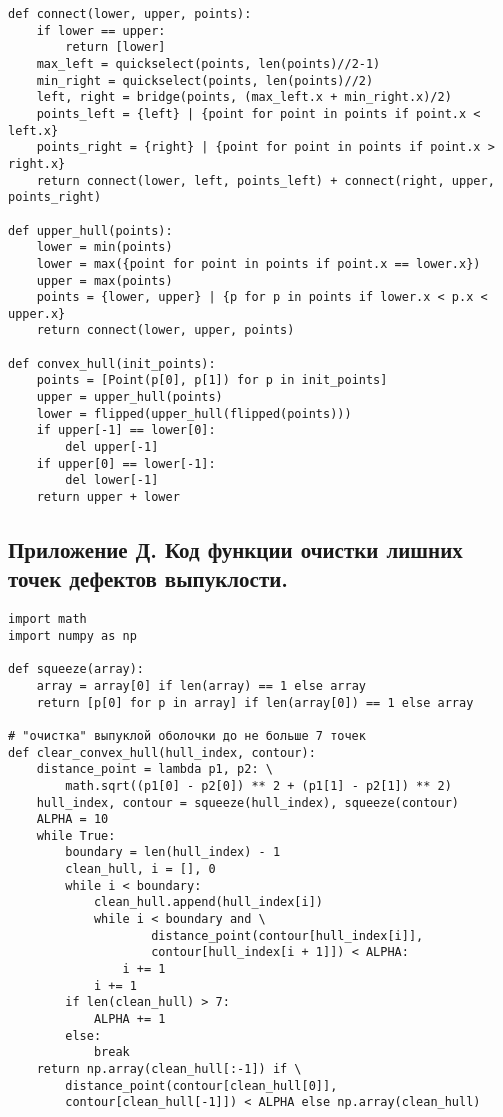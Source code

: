 \begin{verbatim}
def connect(lower, upper, points):
    if lower == upper:
        return [lower]
    max_left = quickselect(points, len(points)//2-1)
    min_right = quickselect(points, len(points)//2)
    left, right = bridge(points, (max_left.x + min_right.x)/2)
    points_left = {left} | {point for point in points if point.x < left.x}
    points_right = {right} | {point for point in points if point.x > right.x}
    return connect(lower, left, points_left) + connect(right, upper, points_right)

def upper_hull(points):
    lower = min(points)
    lower = max({point for point in points if point.x == lower.x})
    upper = max(points)
    points = {lower, upper} | {p for p in points if lower.x < p.x < upper.x}
    return connect(lower, upper, points)

def convex_hull(init_points):
    points = [Point(p[0], p[1]) for p in init_points]
    upper = upper_hull(points)
    lower = flipped(upper_hull(flipped(points)))
    if upper[-1] == lower[0]:
        del upper[-1]
    if upper[0] == lower[-1]:
        del lower[-1]
    return upper + lower
\end{verbatim}

\newpage

\subsection*{Приложение Д. Код функции очистки лишних точек дефектов выпуклости.}

\begin{verbatim}
import math
import numpy as np

def squeeze(array):
    array = array[0] if len(array) == 1 else array
    return [p[0] for p in array] if len(array[0]) == 1 else array

# "очистка" выпуклой оболочки до не больше 7 точек
def clear_convex_hull(hull_index, contour):
    distance_point = lambda p1, p2: \
    	math.sqrt((p1[0] - p2[0]) ** 2 + (p1[1] - p2[1]) ** 2)
    hull_index, contour = squeeze(hull_index), squeeze(contour)
    ALPHA = 10
    while True:
        boundary = len(hull_index) - 1
        clean_hull, i = [], 0
        while i < boundary:
            clean_hull.append(hull_index[i])
            while i < boundary and \
                    distance_point(contour[hull_index[i]],
                    contour[hull_index[i + 1]]) < ALPHA:
                i += 1
            i += 1
        if len(clean_hull) > 7:
            ALPHA += 1
        else:
            break
    return np.array(clean_hull[:-1]) if \
        distance_point(contour[clean_hull[0]],
        contour[clean_hull[-1]]) < ALPHA else np.array(clean_hull)
\end{verbatim}
